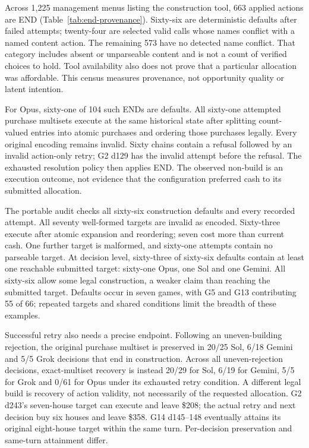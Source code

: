 Across 1,225 management menus listing the construction tool, 663 applied actions are END (Table~\ref{tab:end-provenance}). Sixty-six are deterministic defaults after failed attempts; twenty-four are selected valid calls whose names conflict with a named content action. The remaining 573 have no detected name conflict. That category includes absent or unparseable content and is not a count of verified choices to hold. Tool availability also does not prove that a particular allocation was affordable. This census measures provenance, not opportunity quality or latent intention.



For Opus, sixty-one of 104 such ENDs are defaults. All sixty-one attempted purchase multisets execute at the same historical state after splitting count-valued entries into atomic purchases and ordering those purchases legally. Every original encoding remains invalid. Sixty chains contain a refusal followed by an invalid action-only retry; G2 d129 has the invalid attempt before the refusal. The exhausted resolution policy then applies END. The observed non-build is an execution outcome, not evidence that the configuration preferred cash to its submitted allocation.



The portable audit checks all sixty-six construction defaults and every recorded attempt. All seventy well-formed targets are invalid as encoded. Sixty-three execute after atomic expansion and reordering; seven cost more than current cash. One further target is malformed, and sixty-one attempts contain no parseable target. At decision level, sixty-three of sixty-six defaults contain at least one reachable submitted target: sixty-one Opus, one Sol and one Gemini. All sixty-six allow some legal construction, a weaker claim than reaching the submitted target. Defaults occur in seven games, with G5 and G13 contributing 55 of 66; repeated targets and shared conditions limit the breadth of these examples.

Successful retry also needs a precise endpoint. Following an uneven-building rejection, the original purchase multiset is preserved in 20/25 Sol, 6/18 Gemini and 5/5 Grok decisions that end in construction. Across all uneven-rejection decisions, exact-multiset recovery is instead 20/29 for Sol, 6/19 for Gemini, 5/5 for Grok and 0/61 for Opus under its exhausted retry condition. A different legal build is recovery of action validity, not necessarily of the requested allocation. G2 d243's seven-house target can execute and leave \$208; the actual retry and next decision buy six houses and leave \$358. G14 d145--148 eventually attains its original eight-house target within the same turn. Per-decision preservation and same-turn attainment differ.

